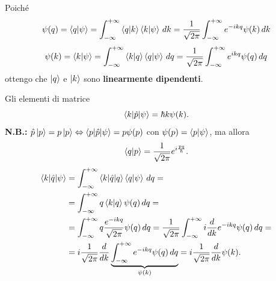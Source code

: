 \bigskip
\noindent
Poiché
\[
\psi(q) = \braket{q|\psi} = \int_{-\infty}^{+\infty} \braket{q|k} \braket{k|\psi} \, dk = \frac{1}{\sqrt{2\pi}} \int_{-\infty}^{+\infty} e^{-ikq} \psi(k) \, dk
\]
\[
\psi(k) = \braket{k|\psi} = \int_{-\infty}^{+\infty} \braket{k|q} \braket{q|\psi} \, dq = \frac{1}{\sqrt{2\pi}} \int_{-\infty}^{+\infty} e^{ikq} \psi(q) \, dq
\]
ottengo che \( \ket{q} \) e \( \ket{k} \) sono \textbf{linearmente dipendenti}.

\bigskip
\noindent
Gli elementi di matrice
\[
\braket{k|\hat{p}|\psi} = \hbar k \psi(k).
\]
\textbf{N.B.:} \( \hat{p}\ket{p} = p \ket{p} \Leftrightarrow \braket{p|\hat{p}|\psi}  = p \psi(p) \) con \( \psi(p) = \braket{p|\psi} \), ma allora
\[
\braket{q|p} = \frac{1}{\sqrt{2\pi}} e^{i \frac{pq}{\hbar}}.
\]
\begin{align*}
\braket{k|\hat{q}|\psi} &= \int_{-\infty}^{+\infty} \braket{k|\hat{q}|q} \braket{q|\psi} \, dq = \\
&= \int_{-\infty}^{+\infty} q \braket{k|q} \psi(q) \, dq = \\
&= \int_{-\infty}^{+\infty} q \frac{e^{-ikq}}{\sqrt{2\pi}} \psi(q) \, dq = \frac{1}{\sqrt{2\pi}} \int_{-\infty}^{+\infty} i \frac{d}{dk} e^{-ikq} \psi(q) \, dq = \\
&= i \frac{1}{\sqrt{2\pi}} \frac{d}{dk} \underbrace{\int_{-\infty}^{+\infty} e^{-ikq} \psi(q) \, dq}_{\psi(k)} = i \frac{1}{\sqrt{2\pi}}\frac{d}{dk} \psi(k).
\end{align*}